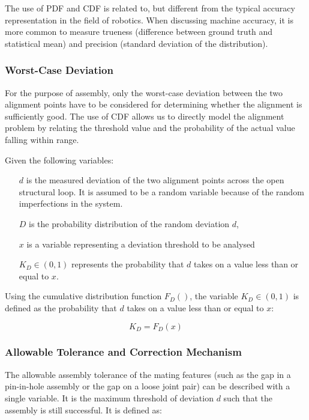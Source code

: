 The use of PDF and CDF is related to, but different from the typical accuracy representation in the field of robotics. When discussing machine accuracy, it is more common to measure trueness (difference between ground truth and statistical mean) and precision (standard deviation of the distribution).

\subsubsection{Worst-Case Deviation}
\label{subsubsection:worst-case-deviation}

For the purpose of assembly, only the worst-case deviation between the two alignment points have to be considered for determining whether the alignment is sufficiently good. The use of CDF allows us to directly model the alignment problem by relating the threshold value and the probability of the actual value falling within range.

Given the following variables:

\begin{itemize}[nosep, leftmargin=20mm]
	\item [$d$] is the measured deviation of the two alignment points across the open structural loop. It is assumed to be a random variable because of the random imperfections in the system.
	\item [$D$] is the probability distribution of the random deviation $d$,
	\item [$x$] is a variable representing a deviation threshold to be analysed
	\item [$K_D \in (0,1)$] represents the probability that $d$ takes on a value less than or equal to $x$.
\end{itemize}

Using the cumulative distribution function $F_D ()$, the variable $K_D \in (0,1)$ is defined as the probability that $d$ takes on a value less than or equal to $x$:

\begin{equation}
    K_D = F_D (x)
\end{equation}

\subsubsection{Allowable Tolerance and Correction Mechanism}
\label{subsubsection:allowable-tolerance-and-correction-mechanism}

The allowable assembly tolerance of the mating features (such as the gap in a pin-in-hole assembly or the gap on a loose joint pair) can be described with a single variable. It is the maximum threshold of deviation $d$ such that the assembly is still successful. It is defined as:

